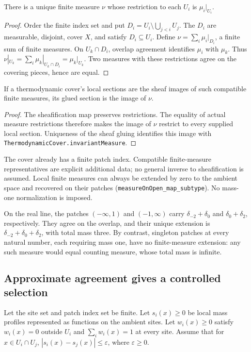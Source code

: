 \begin{claim}
There is a unique finite measure $\nu$ whose restriction to each $U_i$ is
$\mu_i|_{U_i}$.
\end{claim}
\begin{proof}
Order the finite index set and put
$D_i=U_i\setminus\bigcup_{j<i}U_j$. The $D_i$ are measurable, disjoint,
cover $X$, and satisfy $D_i\subseteq U_i$. Define
$\nu=\sum_i\mu_i|_{D_i}$, a finite sum of finite measures.
On $U_k\cap D_i$, overlap agreement identifies $\mu_i$ with $\mu_k$.
Thus $\nu|_{U_k}=\sum_i\mu_k|_{U_k\cap D_i}=\mu_k|_{U_k}$.
Two measures with these restrictions agree on the covering pieces, hence
are equal.
\end{proof}

\begin{claim}
If a thermodynamic cover's local sections are the sheaf images of such
compatible finite measures, its glued section is the image of $\nu$.
\end{claim}
\begin{proof}
The sheafification map preserves restrictions. The equality of actual
measure restrictions therefore makes the image of $\nu$ restrict to every
supplied local section. Uniqueness of the sheaf gluing identifies this image
with \texttt{ThermodynamicCover.invariantMeasure}.
\end{proof}
\scope The cover already has a finite patch index. Compatible finite-measure
representatives are explicit additional data; no general inverse to
sheafification is assumed. Local finite measures can always be extended by
zero to the ambient space and recovered on their patches
(\texttt{measureOnOpen\_map\_subtype}). No mass-one normalization is imposed.

On the real line, the patches $(-\infty,1)$ and $(-1,\infty)$ carry
$\delta_{-2}+\delta_0$ and $\delta_0+\delta_2$, respectively. They agree on
the overlap, and their unique extension is
$\delta_{-2}+\delta_0+\delta_2$, with total mass three.
By contrast, singleton patches at every natural number, each requiring mass
one, have no finite-measure extension: any such measure would equal counting
measure, whose total mass is infinite.

\subsection{Approximate agreement gives a controlled selection}
Let the site set and patch index set be finite. Let $s_i(x)\geq0$ be local
mass profiles represented as functions on the ambient sites. Let
$w_i(x)\geq0$ satisfy $w_i(x)=0$ outside $U_i$ and
$\sum_i w_i(x)=1$ at every site. Assume that for $x\in U_i\cap U_j$,
$|s_i(x)-s_j(x)|\leq\varepsilon$, where $\varepsilon\geq0$.

